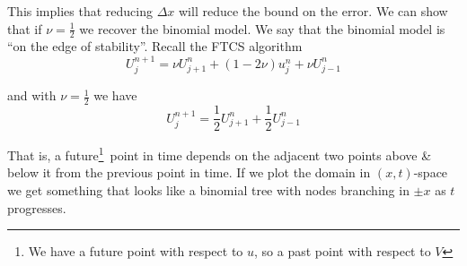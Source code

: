 \documentclass[12pt]{article}
\newlength\tindent
\renewcommand{\indent}{\hspace*{\tindent}}
\begin{document}
\indent This implies that reducing $\Delta x$ will reduce the bound on the error. We can show that if $\nu = \frac{1}{2}$ we recover the binomial model. We say that the binomial model is ``on the edge of stability''. Recall the FTCS algorithm
\begin{equation*}
	U^{n + 1}_j = \nu U^n_{j + 1} + (1 - 2\nu) u^n_j + \nu U^n_{j - 1}
\end{equation*}

and with $\nu = \frac{1}{2}$ we have
\begin{equation*}
	U^{n + 1}_j = \frac{1}{2}U^n_{j + 1} + \frac{1}{2} U^n_{j - 1}
\end{equation*}

\indent That is, a future\footnote{We have a future point with respect to $u$, so a past point with respect to $V$}~point in time depends on the adjacent two points above \& below it from the previous point in time. If we plot the domain in $(x, t)$-space we get something that looks like a binomial tree with nodes branching in $\pm x$ as $t$ progresses.
\end{document}
